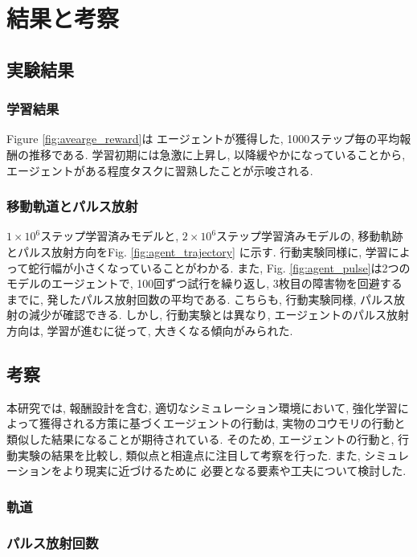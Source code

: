 \documentclass[../main]{subfiles}
\begin{document}
\newpage
\chapter{結果と考察}
\label{chap:result}
\section{実験結果}
\subsection{学習結果}
Figure \ref{fig:avearge_reward}は
エージェントが獲得した, 
1000ステップ毎の平均報酬の推移である.
学習初期には急激に上昇し, 以降緩やかになっていることから, 
エージェントがある程度タスクに習熟したことが示唆される.

\subsection{移動軌道とパルス放射}
$1\times 10^6$ステップ学習済みモデルと, 
$2\times 10^6$ステップ学習済みモデルの,
移動軌跡とパルス放射方向をFig. \ref{fig:agent_trajectory}
に示す.
行動実験同様に, 学習によって蛇行幅が小さくなっていることがわかる.
また, Fig. \ref{fig:agent_pulse}は2つのモデルのエージェントで, 
100回ずつ試行を繰り返し, 3枚目の障害物を回避するまでに, 
発したパルス放射回数の平均である.
こちらも, 行動実験同様, パルス放射の減少が確認できる.
しかし, 行動実験とは異なり, エージェントのパルス放射方向は, 
学習が進むに従って, 大きくなる傾向がみられた.


\section{考察}
本研究では, 報酬設計を含む, 適切なシミュレーション環境において, 
強化学習によって獲得される方策に基づくエージェントの行動は, 
実物のコウモリの行動と類似した結果になることが期待されている.
そのため, エージェントの行動と, 行動実験の結果を比較し, 
類似点と相違点に注目して考察を行った. 
また, シミュレーションをより現実に近づけるために
必要となる要素や工夫について検討した.

\subsection{軌道}

\subsection{パルス放射回数}
\end{document}
